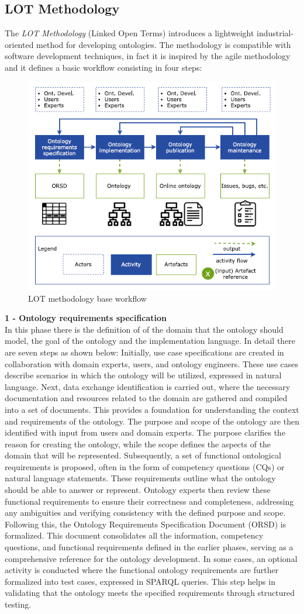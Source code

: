 \subsection{LOT Methodology}
The \textit{LOT Methodology} (Linked Open Terms) \cite{poveda2022lot} introduces a lightweight industrial-oriented method for developing ontologies. The methodology is compatible with software development techniques, in fact it is inspired by the agile methodology and it defines a basic workflow consisting in four steps:
\begin{figure}[H]
    \centering
    \includegraphics[width=0.5\linewidth]{Figures/fig_3.png}
    \caption{LOT methodology base workflow}
    \label{fig:enter-label}
\end{figure}


\textbf{1 - Ontology requirements specification}\\
In this phase there is the definition of of the domain that the ontology should model, the goal of the ontology and the implementation language. In detail there are seven steps as shown below:
Initially, use case specifications are created in collaboration with domain experts, users, and ontology engineers. These use cases describe scenarios in which the ontology will be utilized, expressed in natural language. Next, data exchange identification is carried out, where the necessary documentation and resources related to the domain are gathered and compiled into a set of documents. This provides a foundation for understanding the context and requirements of the ontology. The purpose and scope of the ontology are then identified with input from users and domain experts. The purpose clarifies the reason for creating the ontology, while the scope defines the aspects of the domain that will be represented. Subsequently, a set of functional ontological requirements is proposed, often in the form of competency questions (CQs) or natural language statements. These requirements outline what the ontology should be able to answer or represent. Ontology experts then review these functional requirements to ensure their correctness and completeness, addressing any ambiguities and verifying consistency with the defined purpose and scope. Following this, the Ontology Requirements Specification Document (ORSD) is formalized. This document consolidates all the information, competency questions, and functional requirements defined in the earlier phases, serving as a comprehensive reference for the ontology development. In some cases, an optional activity is conducted where the functional ontology requirements are further formalized into test cases, expressed in SPARQL queries. This step helps in validating that the ontology meets the specified requirements through structured testing.

